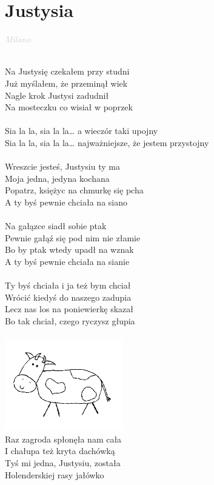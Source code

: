 \documentclass[a5paper, 10pt]{book}
\begin{document}
\newpage
\section{Justysia}\textcolor{lightgray}{\textit{Milano}}\\~\\
\begin{minipage}[t]{0.75\textwidth}
  Na Justysię czekałem przy studni\\
  Już myślałem, że przeminął wiek\\
  Nagle krok Justysi zadudnił\\
  Na mosteczku co wisiał w poprzek\\
  \\
  \hspace*{5mm}Sia la la, sia la la… a wieczór taki upojny\\
  \hspace*{5mm}Sia la la, sia la la… najważniejsze, że jestem przystojny\\
  \\
  Wreszcie jesteś, Justysiu ty ma\\
  Moja jedna, jedyna kochana\\
  Popatrz, księżyc na chmurkę się pcha\\
  A ty byś pewnie chciała na siano\\
  \\
  Na gałązce siadł sobie ptak\\
  Pewnie gałąź się pod nim nie złamie\\
  Bo by ptak wtedy upadł na wznak\\
  A ty byś pewnie chciała na sianie\\
  \\
  Ty byś chciała i ja też bym chciał\\
  Wrócić kiedyś do naszego zadupia\\
  Lecz nas los na poniewierkę skazał\\
  Bo tak chciał, czego ryczysz głupia\\
  \\
  \includegraphics[height=4cm, angle=10, right]{images/justysia.png}\vspace*{-4.9cm}\\
  Raz zagroda spłonęła nam cała\\
  I chałupa też kryta dachówką\\
  Tyś mi jedna, Justysiu, została\\
  Holenderskiej rasy jałówko\\
  \\
\end{minipage}
\end{document}
